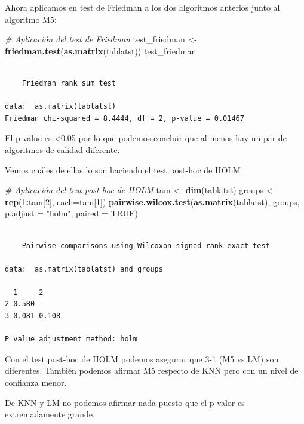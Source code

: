 \documentclass[
]{article}
\newenvironment{Shaded}{\begin{snugshade}}{\end{snugshade}}
\newcommand{\CommentTok}[1]{\textcolor[rgb]{0.56,0.35,0.01}{\textit{#1}}}
\newcommand{\DataTypeTok}[1]{\textcolor[rgb]{0.13,0.29,0.53}{#1}}
\newcommand{\DecValTok}[1]{\textcolor[rgb]{0.00,0.00,0.81}{#1}}
\newcommand{\KeywordTok}[1]{\textcolor[rgb]{0.13,0.29,0.53}{\textbf{#1}}}
\newcommand{\NormalTok}[1]{#1}
\newcommand{\OperatorTok}[1]{\textcolor[rgb]{0.81,0.36,0.00}{\textbf{#1}}}
\newcommand{\OtherTok}[1]{\textcolor[rgb]{0.56,0.35,0.01}{#1}}
\newcommand{\StringTok}[1]{\textcolor[rgb]{0.31,0.60,0.02}{#1}}
\begin{document}
Ahora aplicamos en test de Friedman a los dos algoritmos anterios junto
al algoritmo M5:

\begin{Shaded}
\begin{Highlighting}[]
\CommentTok{# Aplicación del test de Friedman}
\NormalTok{test_friedman <-}\StringTok{ }\KeywordTok{friedman.test}\NormalTok{(}\KeywordTok{as.matrix}\NormalTok{(tablatst))}
\NormalTok{test_friedman}
\end{Highlighting}
\end{Shaded}

\begin{verbatim}

    Friedman rank sum test

data:  as.matrix(tablatst)
Friedman chi-squared = 8.4444, df = 2, p-value = 0.01467
\end{verbatim}

El p-value es \textless0.05 por lo que podemos concluir que al menos hay
un par de algoritmos de calidad diferente.

Vemos cuáles de ellos lo son haciendo el test post-hoc de HOLM

\begin{Shaded}
\begin{Highlighting}[]
\CommentTok{# Aplicación del test post-hoc de HOLM}
\NormalTok{tam <-}\StringTok{ }\KeywordTok{dim}\NormalTok{(tablatst)}
\NormalTok{groups <-}\StringTok{ }\KeywordTok{rep}\NormalTok{(}\DecValTok{1}\OperatorTok{:}\NormalTok{tam[}\DecValTok{2}\NormalTok{], }\DataTypeTok{each=}\NormalTok{tam[}\DecValTok{1}\NormalTok{])}
\KeywordTok{pairwise.wilcox.test}\NormalTok{(}\KeywordTok{as.matrix}\NormalTok{(tablatst), groups, }\DataTypeTok{p.adjust =} \StringTok{"holm"}\NormalTok{, }\DataTypeTok{paired =} \OtherTok{TRUE}\NormalTok{)}
\end{Highlighting}
\end{Shaded}

\begin{verbatim}

    Pairwise comparisons using Wilcoxon signed rank exact test 

data:  as.matrix(tablatst) and groups 

  1     2    
2 0.580 -    
3 0.081 0.108

P value adjustment method: holm 
\end{verbatim}

Con el test post-hoc de HOLM podemos asegurar que 3-1 (M5 vs LM) son
diferentes. También podemos afirmar M5 respecto de KNN pero con un nivel
de confianza menor.

De KNN y LM no podemos afirmar nada puesto que el p-valor es
extremadamente grande.
\end{document}
